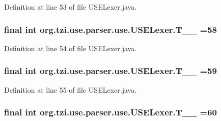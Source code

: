 Definition at line 53 of file U\-S\-E\-Lexer.\-java.

\hypertarget{classorg_1_1tzi_1_1use_1_1parser_1_1use_1_1_u_s_e_lexer_a83b76fa75a9dd68beb3aea29b8d94668}{
\subsubsection[{T\-\_\-\-\_\-58}]{\setlength{\rightskip}{0pt plus 5cm}final int org.\-tzi.\-use.\-parser.\-use.\-U\-S\-E\-Lexer.\-T\-\_\-\-\_ =58\hspace{0.3cm}{\ttfamily [static]}}}\label{classorg_1_1tzi_1_1use_1_1parser_1_1use_1_1_u_s_e_lexer_a83b76fa75a9dd68beb3aea29b8d94668}


Definition at line 54 of file U\-S\-E\-Lexer.\-java.

\hypertarget{classorg_1_1tzi_1_1use_1_1parser_1_1use_1_1_u_s_e_lexer_a910a713146504fd43d3cacdb819771b2}{
\subsubsection[{T\-\_\-\-\_\-59}]{\setlength{\rightskip}{0pt plus 5cm}final int org.\-tzi.\-use.\-parser.\-use.\-U\-S\-E\-Lexer.\-T\-\_\-\-\_ =59\hspace{0.3cm}{\ttfamily [static]}}}\label{classorg_1_1tzi_1_1use_1_1parser_1_1use_1_1_u_s_e_lexer_a910a713146504fd43d3cacdb819771b2}


Definition at line 55 of file U\-S\-E\-Lexer.\-java.

\hypertarget{classorg_1_1tzi_1_1use_1_1parser_1_1use_1_1_u_s_e_lexer_a70ca81da377f05a03856332b6d24248a}{
\subsubsection[{T\-\_\-\-\_\-60}]{\setlength{\rightskip}{0pt plus 5cm}final int org.\-tzi.\-use.\-parser.\-use.\-U\-S\-E\-Lexer.\-T\-\_\-\-\_ =60\hspace{0.3cm}{\ttfamily [static]}}}\label{classorg_1_1tzi_1_1use_1_1parser_1_1use_1_1_u_s_e_lexer_a70ca81da377f05a03856332b6d24248a}


